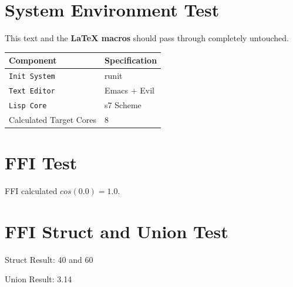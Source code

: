 \documentclass{article}
\begin{document}


\section{System Environment Test}
This text and the \textbf{LaTeX macros} should pass through completely untouched.

\begin{tabular}{|l|l|}
    \hline
    \textbf{Component} & \textbf{Specification} \\ \hline
    \texttt{Init System} & runit \\ \hline

    \texttt{Text Editor} & Emacs + Evil \\ \hline

    \texttt{Lisp Core} & s7 Scheme \\ \hline

    
    Calculated Target Cores & 8 \\ \hline
\end{tabular}

\section{FFI Test}








FFI calculated $cos(0.0) = 1.0$.

\section{FFI Struct and Union Test}











Struct Result: 40 and 60

Union Result: 3.14
\end{document}
